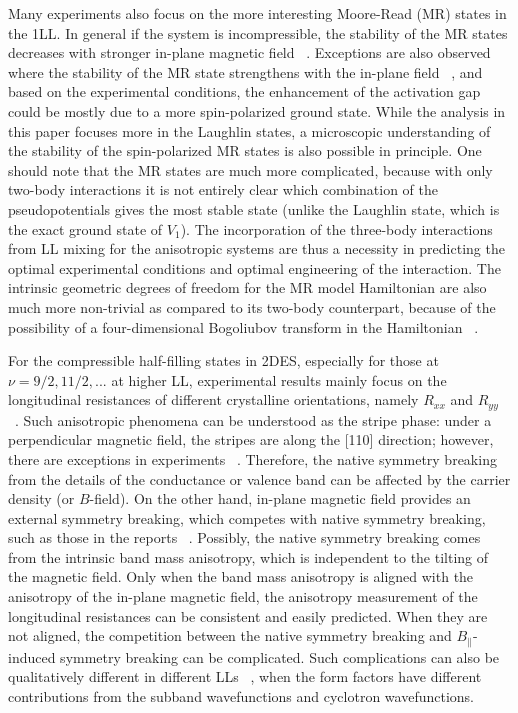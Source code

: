 \documentclass[twocolumn,showpacs,amsmath,amstex,amssymb,mathfonts,prb]{revtex4-1}
\begin{document}
Many experiments also focus on the more interesting Moore-Read (MR) states in the 1LL. In general if the system is incompressible, the stability of the MR states decreases with stronger in-plane magnetic field ~\cite{dean08,chi10}.
Exceptions are also observed where the stability of the MR state strengthens with the in-plane field ~\cite{chi12, chithesis}, and based on the experimental conditions, the enhancement of the activation gap could be mostly due to a more spin-polarized ground state. While the analysis in this paper focuses more in the Laughlin states, a microscopic understanding of the stability of the spin-polarized MR states is also possible in principle. One should note that the MR states are much more complicated, because with only two-body interactions it is not entirely clear which combination of the pseudopotentials gives the most stable state (unlike the Laughlin state, which is the exact ground state of $V_1$). The incorporation of the three-body interactions from LL mixing for the anisotropic systems are thus a necessity in predicting the optimal experimental conditions and optimal engineering of the interaction. The intrinsic geometric degrees of freedom for the MR model Hamiltonian are also much more non-trivial as compared to its two-body counterpart, because of the possibility of a four-dimensional Bogoliubov transform in the Hamiltonian ~\cite{yang_future}.

For the compressible half-filling states in 2DES, especially for those at $\nu=9/2, 11/2,...$ at higher LL, experimental results mainly focus on the longitudinal resistances of different crystalline orientations, namely $R_{xx}$ and $R_{yy}$ ~\cite{lilly99, du99, lilly99_2, chithesis}. Such anisotropic phenomena can be understood as the stripe phase: under a perpendicular magnetic field, the stripes are along the [110] direction; however, there are exceptions in experiments ~\cite{zhu02}.
Therefore, the native symmetry breaking from the details of the conductance or valence band can be affected by the carrier density (or $B$-field). On the other hand, in-plane magnetic field provides an external symmetry breaking, which competes with native symmetry breaking, such as those in the reports ~\cite{lilly99_2, pan99, chi10}.
Possibly, the native symmetry breaking comes from the intrinsic band mass anisotropy, which is independent to the tilting of the magnetic field. Only when the band mass anisotropy is aligned with the anisotropy of the in-plane magnetic field, the anisotropy measurement of the longitudinal resistances can be consistent and easily predicted.
When they are not aligned, the competition between the native symmetry breaking and $B_{\parallel}$-induced symmetry breaking can be complicated. Such complications can also be qualitatively different in different LLs ~\cite{shi16}, when the form factors have different contributions from the subband wavefunctions and cyclotron wavefunctions. 
\end{document}
